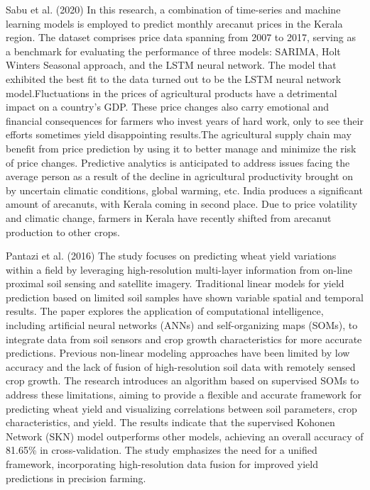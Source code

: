         Sabu et al. (2020) \cite{sabu2020} In this research, a combination of time-series and machine learning models is employed to predict monthly arecanut prices in the Kerala region. The dataset comprises price data spanning from 2007 to 2017, serving as a benchmark for evaluating the performance of three models: SARIMA, Holt Winters Seasonal approach, and the LSTM neural network. The model that exhibited the best fit to the data turned out to be the LSTM neural network model.Fluctuations in the prices of agricultural products have a detrimental impact on a country's GDP. These price changes also carry emotional and financial consequences for farmers who invest years of hard work, only to see their efforts sometimes yield disappointing results.The agricultural supply chain may benefit from price prediction by using it to better manage and minimize the risk of price changes. Predictive analytics is anticipated to address issues facing the average person as a result of the decline in agricultural productivity brought on by uncertain climatic conditions, global warming, etc. India produces a significant amount of arecanuts, with Kerala coming in second place. Due to price volatility and climatic change, farmers in Kerala have recently shifted from arecanut production to other crops. 
        
        Pantazi et al. (2016) \cite{pantazi2016} The study focuses on predicting wheat yield variations within a field by leveraging high-resolution multi-layer information from on-line proximal soil sensing and satellite imagery. Traditional linear models for yield prediction based on limited soil samples have shown variable spatial and temporal results. The paper explores the application of computational intelligence, including artificial neural networks (ANNs) and self-organizing maps (SOMs), to integrate data from soil sensors and crop growth characteristics for more accurate predictions. Previous non-linear modeling approaches have been limited by low accuracy and the lack of fusion of high-resolution soil data with remotely sensed crop growth. The research introduces an algorithm based on supervised SOMs to address these limitations, aiming to provide a flexible and accurate framework for predicting wheat yield and visualizing correlations between soil parameters, crop characteristics, and yield. The results indicate that the supervised Kohonen Network (SKN) model outperforms other models, achieving an overall accuracy of 81.65\% in cross-validation. The study emphasizes the need for a unified framework, incorporating high-resolution data fusion for improved yield predictions in precision farming.
        

